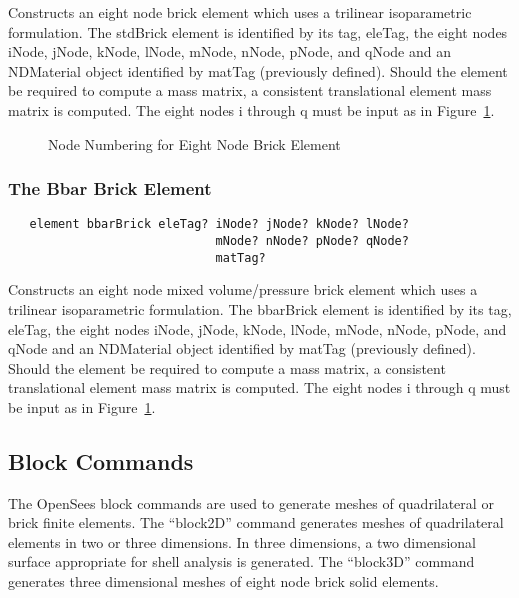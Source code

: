 \documentclass[12pt]{article}
\begin{document}
\noindent Constructs an eight node brick element which uses a trilinear
isoparametric formulation. 
The stdBrick element is identified by its tag,
eleTag, 
the eight nodes iNode, jNode, kNode, lNode,
mNode, nNode, pNode, and qNode
and an NDMaterial object identified by matTag (previously
defined). 
Should the element be required to compute a mass matrix, a consistent 
translational element mass matrix is computed.
The eight nodes i through q must be input as in
Figure~\ref{bricknodenumbering}.
\begin{figure}[htpb]
\begin{center}
\end{center}
\caption{Node Numbering for Eight Node Brick Element}
\label{bricknodenumbering}
\end{figure}


\subsubsection{The Bbar Brick Element}
{\sf\small
\begin{verbatim}
   element bbarBrick eleTag? iNode? jNode? kNode? lNode? 
                             mNode? nNode? pNode? qNode?
                             matTag? 
\end{verbatim}
}

\noindent Constructs an eight node 
mixed volume/pressure brick element which uses a trilinear
isoparametric formulation. 
The bbarBrick element is identified by its tag,
eleTag, 
the eight nodes iNode, jNode, kNode, lNode,
mNode, nNode, pNode, and qNode
and an NDMaterial object identified by matTag (previously
defined). 
Should the element be required to compute a mass matrix, a consistent 
translational element mass matrix is computed.
The eight nodes i through q must be input as in
Figure~\ref{bricknodenumbering}.


\subsection{Block Commands}

The OpenSees block commands are used to generate meshes of quadrilateral or
brick finite elements.  The ``block2D'' command generates meshes of quadrilateral
elements in two or three dimensions.  In three dimensions, a two dimensional surface
appropriate for shell analysis is generated.  The ``block3D'' command generates 
three dimensional meshes of eight node brick solid elements.
\end{document}
